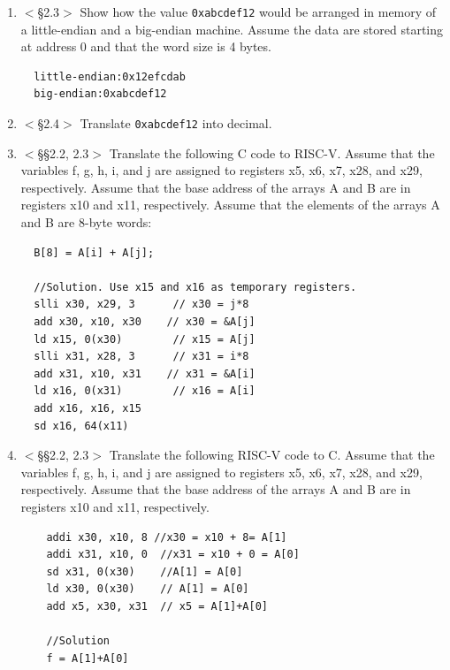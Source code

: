\documentclass[11pt]{article}
\begin{document}
\begin{enumerate}
\begin{lstlisting}
  //Solution
  B[g] = A[f+1] + A[f];
\end{lstlisting}
\item [2.5][5] $<$§2.3$>$ Show how the value \lstinline|0xabcdef12| would be arranged in memory
of a little-endian and a big-endian machine. Assume the data are stored starting at
address 0 and that the word size is 4 bytes.
\begin{lstlisting}
  little-endian:0x12efcdab
  big-endian:0xabcdef12
\end{lstlisting}
\item[2.6][5] $<$§2.4$>$ Translate \lstinline|0xabcdef12| into decimal.
\item[2.7] [5] $<$§§2.2, 2.3$>$ Translate the following C code to RISC-V. Assume that the
variables f, g, h, i, and j are assigned to registers x5, x6, x7, x28, and x29,
respectively. Assume that the base address of the arrays A and B are in registers x10
and x11, respectively. Assume that the elements of the arrays A and B are 8-byte
words:
\begin{lstlisting}
  B[8] = A[i] + A[j]; 

  //Solution. Use x15 and x16 as temporary registers.
  slli x30, x29, 3      // x30 = j*8
  add x30, x10, x30    // x30 = &A[j]
  ld x15, 0(x30)        // x15 = A[j]
  slli x31, x28, 3      // x31 = i*8
  add x31, x10, x31    // x31 = &A[i]
  ld x16, 0(x31)        // x16 = A[i]
  add x16, x16, x15
  sd x16, 64(x11)
\end{lstlisting}
\item[2.8][10] $<$§§2.2, 2.3$>$ Translate the following RISC-V code to C. Assume that the
variables f, g, h, i, and j are assigned to registers x5, x6, x7, x28, and x29, respectively. Assume that the base address of the arrays A and B are in registers x10
and x11, respectively.
  \begin{lstlisting}
    addi x30, x10, 8 //x30 = x10 + 8= A[1]
    addi x31, x10, 0  //x31 = x10 + 0 = A[0]
    sd x31, 0(x30)    //A[1] = A[0]
    ld x30, 0(x30)    // A[1] = A[0]
    add x5, x30, x31  // x5 = A[1]+A[0]

    //Solution
    f = A[1]+A[0]
  \end{lstlisting}
  \end{enumerate}
\end{document}
